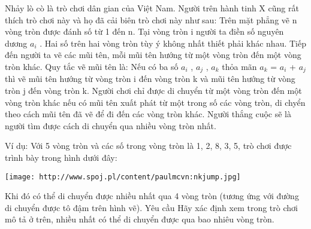 Nhảy lò cò là trò chơi dân gian của Việt Nam. Người trên hành tinh X cũng rất thích trò chơi này và họ đã cải biên trò chơi này như sau: Trên mặt phẳng vẽ n vòng tròn được đánh số từ 1 đến n. Tại vòng tròn i người ta điền số nguyên dương $a_{i}$ . Hai số trên hai vòng tròn tùy ý không nhất thiết phải khác nhau. Tiếp đến người ta vẽ các mũi tên, mỗi mũi tên hướng từ một vòng tròn đến một vòng tròn khác. Quy tắc vẽ mũi tên là: Nếu có ba số $a_{i}$ , $a_{j}$ , $a_{k}$ thỏa mãn $a_{k}$ = $a_{i}$ + $a_{j}$ thì vẽ mũi tên hướng từ vòng tròn i đến vòng tròn k và mũi tên hướng từ vòng tròn j đến vòng tròn k. Người chơi chỉ được di chuyển từ một vòng tròn đến một vòng tròn khác nếu có mũi tên xuất phát từ một trong số các vòng tròn, di chyển theo cách mũi tên đã vẽ để đi đến các vòng tròn khác. Người thắng cuộc sẽ là người tìm được cách di chuyển qua nhiều vòng tròn nhất.

Ví dụ: Với 5 vòng tròn và các số trong vòng tròn là 1, 2, 8, 3, 5, trò chơi được trình bày trong hình dưới đây:


\texttt{[image: http://www.spoj.pl/content/paulmcvn:nkjump.jpg]}

Khi đó có thể di chuyển được nhiều nhất qua 4 vòng tròn (tương ứng với đường di chuyển được tô đậm trên hình vẽ).
Yêu cầu
Hãy xác định xem trong trò chơi mô tả ở trên, nhiều nhất có thể di chuyển được qua bao nhiêu vòng tròn.